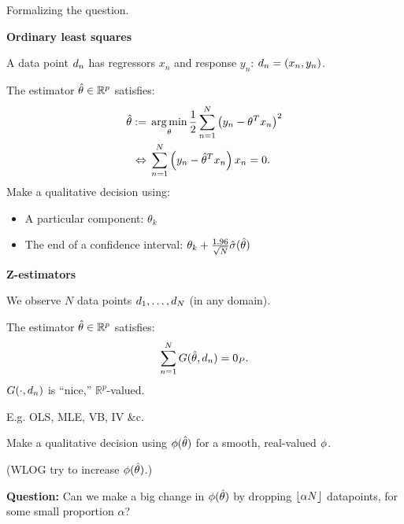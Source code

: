

\begin{frame}[t]{Formalizing the question.}

\begin{minipage}[t]{0.45\textwidth}
\textbf{Ordinary least squares}

A data point $d_n$ has regressors
$x_n$ and response $y_n$: $d_n = (x_n, y_n)$.

\vspace{1em}
The estimator $\hat{\theta} \in \mathbb{R}^p$ satisfies:
%
\begin{align*}
%
\thetahat :={}&
    \argmin_{\theta} \frac{1}{2} \sumn \left(y_n - \theta^T x_n \right)^{2} \\
\Leftrightarrow{}& \sumn \left(y_n - \thetahat^T x_n \right) x_n = 0.
%
\end{align*}
%
Make a qualitative decision using:\vspace{-1.5em}
\begin{itemize}
\item A particular component: $\theta_k$
\item The end of a confidence interval:
    $\theta_k + \frac{1.96}{\sqrt{N}} \hat\sigma(\hat{\theta})$
\end{itemize}
%
\end{minipage}
%
\hfill\vline\hfill
%
\begin{minipage}[t]{0.45\textwidth}
\textbf{Z-estimators}

We observe $N$ data points $d_{1}, \ldots, d_{N}$
(in any domain).

\vspace{1em}
The estimator $\hat{\theta} \in \mathbb{R}^p$ satisfies:
%
\begin{align*}
%
\sumn
G(\thetahat, \d_{n}) =  \zP.
%
\end{align*}
%
$G(\cdot, d_{n})$ is ``nice,'' $\mathbb{R}^p$-valued.

E.g. OLS, MLE, VB, IV \&c.

\vspace{1em}
Make a qualitative decision using $\phi(\hat{\theta})$
for a smooth, real-valued $\phi$.

\vspace{1em}
(WLOG try to increase $\phi(\hat{\theta})$.)
%
\end{minipage}

\hrulefill

\vspace{0.3em}
\textbf{Question: }
Can we make a big change in $\phi(\hat{\theta})$ by dropping
$\lfloor \alpha N \rfloor$ datapoints, for some small proportion $\alpha$?



\end{frame}





